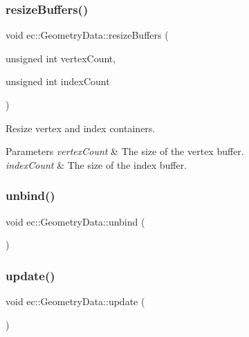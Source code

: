 \subsubsection{\texorpdfstring{resize\+Buffers()}{resizeBuffers()}}
{\footnotesize\ttfamily void ec\+::\+Geometry\+Data\+::resize\+Buffers (\begin{DoxyParamCaption}\item[{unsigned int}]{vertex\+Count,  }\item[{unsigned int}]{index\+Count }\end{DoxyParamCaption})}



Resize vertex and index containers. 


\begin{DoxyParams}{Parameters}
{\em vertex\+Count} & The size of the vertex buffer. \\
\hline
{\em index\+Count} & The size of the index buffer. \\
\hline
\end{DoxyParams}
\mbox{\label{classec_1_1_geometry_data_abb54af4b2922eb16973b450d6cf0beae}} 
\subsubsection{\texorpdfstring{unbind()}{unbind()}}
{\footnotesize\ttfamily void ec\+::\+Geometry\+Data\+::unbind (\begin{DoxyParamCaption}{ }\end{DoxyParamCaption})}

\mbox{\label{classec_1_1_geometry_data_ad8edfa8a7fda52850f072ab845ef38fd}} 
\subsubsection{\texorpdfstring{update()}{update()}}
{\footnotesize\ttfamily void ec\+::\+Geometry\+Data\+::update (\begin{DoxyParamCaption}{ }\end{DoxyParamCaption})}



